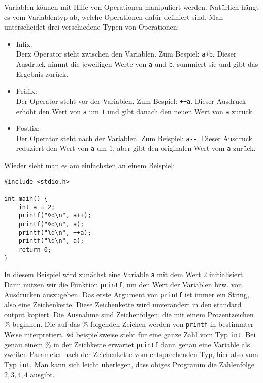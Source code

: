 Variablen können mit Hilfe von Operationen manipuliert werden.
Natürlich hängt es vom Variablentyp ab, welche Operationen dafür definiert sind.
Man unterscheidet drei verschiedene Typen von Operationen:
\begin{itemize}
\item Infix:\\
  Derx Operator steht zwischen den Variablen. Zum Bespiel: \verb|a+b|. 
  Dieser Ausdruck nimmt die jeweiligen Werte von \verb|a| und \verb|b|, summiert sie und gibt das Ergebnis zurück.
\item Präfix:\\
  Der Operator steht vor der Variablen. Zum Bespiel: \verb|++a|. 
  Dieser Ausdruck erhöht den Wert von \verb|a| um $1$ und gibt danach den neuen Wert von \verb|a| zurück.
\item Postfix:\\
  Der Operator steht nach der Variablen. Zum Beispiel: \verb|a--|. 
  Dieser Ausdruck reduziert den Wert von \verb|a| um $1$, aber gibt den originalen Wert vom \verb|a| zurück.
\end{itemize}
Wieder sieht man es am einfachsten an einem Beispiel:
\begin{lstlisting}
#include <stdio.h>

int main() {
    int a = 2;
    printf("%d\n", a++);
    printf("%d\n", a);
    printf("%d\n", ++a);
    printf("%d\n", a);
    return 0;
}
\end{lstlisting}
In diesem Beispiel wird zunächst eine Variable \texttt{a} mit dem Wert $2$ initialisiert. 
Dann nutzen wir die Funktion \texttt{printf}, um den Wert der Variablen bzw. von Ausdrücken auszugeben. 
Das erste Argument von \texttt{printf} ist immer ein String, also eine Zeichenkette.
Diese Zeichenkette wird unverändert in den standard output kopiert.
Die Ausnahme sind Zeichenfolgen, die mit einem Prozentzeichen \% beginnen.
Die auf das \% folgenden Zeichen werden von \texttt{printf} in bestimmter Weise interpretiert.
\verb|%d| beispielsweise steht für eine ganze Zahl vom Typ \texttt{int}. 
Bei genau einem \% in der Zeichkette erwartet \texttt{printf} dann genau eine Variable als zweiten Parameter nach der Zeichenkette vom entsprechenden Typ, hier also vom Typ \texttt{int}.
Man kann sich leicht überlegen, dass obiges Programm die Zahlenfolge $2,3,4,4$ ausgibt.

